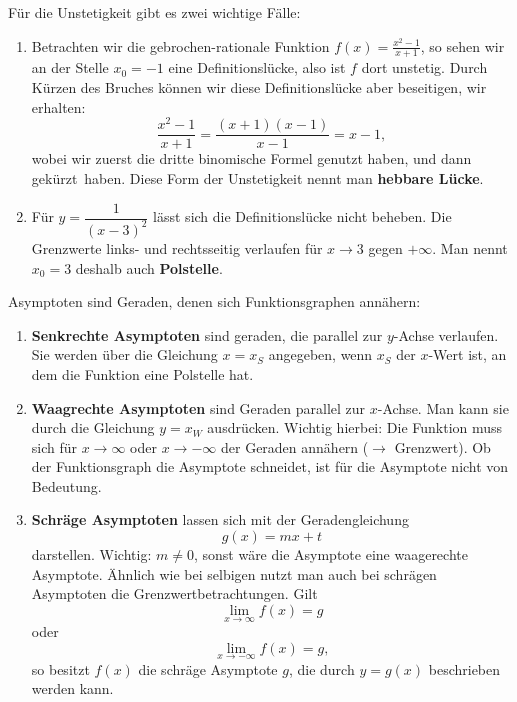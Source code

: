 \documentclass[ngerman, 12pt]{nssheetxea}
\begin{document}
\begin{example}
Für die Unstetigkeit gibt es zwei wichtige Fälle:

\begin{enumerate}
\item Betrachten wir die gebrochen-rationale Funktion $f(x)=\frac{x^2-1}{x+1}$, so sehen wir an der Stelle $x_0=-1$ eine Definitionslücke, also ist $f$ dort unstetig. Durch Kürzen des Bruches können wir diese Definitionslücke aber beseitigen, wir erhalten:
\[ \dfrac{x^2-1}{x+1} = \dfrac{(x+1)(x-1)}{x-1} = x-1,\]
wobei wir zuerst die dritte binomische Formel genutzt haben, und dann \glqq gekürzt\grqq \ haben. Diese Form der Unstetigkeit nennt man \textbf{hebbare Lücke}.
\item Für $y=\dfrac{1}{(x-3)^2}$ lässt sich die Definitionslücke nicht beheben. Die Grenzwerte links- und rechtsseitig verlaufen für $x\to 3$ gegen $+\infty$. Man nennt $x_0=3$ deshalb auch \textbf{Polstelle}.
\end{enumerate}
\end{example}

\begin{definition}
Asymptoten sind Geraden, denen sich Funktionsgraphen annähern: 
\begin{enumerate}
\item \textbf{Senkrechte Asymptoten} sind geraden, die parallel zur $y$-Achse verlaufen. Sie werden über die Gleichung $x=x_S$ angegeben, wenn $x_S$ der $x$-Wert ist, an dem die Funktion eine Polstelle hat.
\item \textbf{Waagrechte Asymptoten} sind Geraden parallel zur $x$-Achse. Man kann sie durch die Gleichung $y=x_W$ ausdrücken. Wichtig hierbei: Die Funktion muss sich für $x\to \infty$ oder $x\to -\infty$ der Geraden annähern ($\rightarrow$ Grenzwert). Ob der Funktionsgraph die Asymptote schneidet, ist für die Asymptote nicht von Bedeutung.
\item \textbf{Schräge Asymptoten} lassen sich mit der Geradengleichung 
\[ g(x)=mx+t\]
darstellen. Wichtig: $m\neq 0$, sonst wäre die Asymptote eine waagerechte Asymptote. Ähnlich wie bei selbigen nutzt man auch bei schrägen Asymptoten die Grenzwertbetrachtungen. Gilt 
\[ \lim_{x\to \infty} f(x) = g\]
oder 
\[ \lim_{x\to -\infty} f(x) = g,\]
so besitzt $f(x)$ die schräge Asymptote $g$, die durch $y=g(x)$ beschrieben werden kann.
\end{enumerate}
 

\end{definition}
\end{document}
